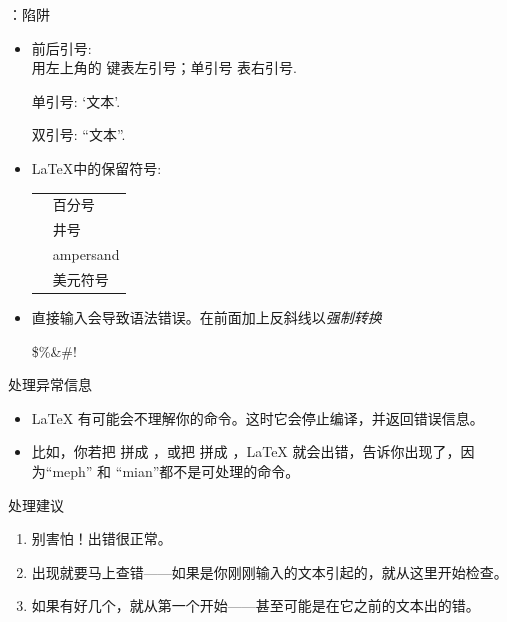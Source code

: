 \documentclass{beamer}
\begin{document}
\begin{frame}[fragile]{\insertsubsection{}：陷阱}
\small
\begin{itemize}
\item 前后引号:\\
用左上角的 \keystroke{\`{}} 键表左引号；单引号\keystroke{\'{}} 表右引号.
\begin{exampletwouptiny}
单引号: `文本'.

双引号: ``文本''.
\end{exampletwouptiny}

\item \LaTeX 中的保留符号:\\[1ex]
\begin{tabular}{cl}
\keystrokebftt{\%} & 百分号              \\
\keystrokebftt{\#} & 井号     \\
\keystrokebftt{\&} & ampersand                 \\
\keystrokebftt{\$} & 美元符号               \\
\end{tabular}
\item 直接输入会导致语法错误。在前面加上反斜线以\emph{强制转换}
\begin{exampletwoup}
\$\%\&\#!
\end{exampletwoup}
\end{itemize}
\end{frame}

\begin{frame}[fragile]{处理异常信息}
\begin{itemize}
\item \LaTeX{} 有可能会不理解你的命令。这时它会停止编译，并返回错误信息。
\item 比如，你若把  拼成 ，或把  拼成 ，\LaTeX{} 就会出错，告诉你出现了，因为``meph'' 和 ``mian''都不是可处理的命令。
\end{itemize}
\begin{block}{处理建议}
\begin{enumerate}
\item 别害怕！出错很正常。
\item 出现就要马上查错——如果是你刚刚输入的文本引起的，就从这里开始检查。
\item 如果有好几个，就从第一个开始——甚至可能是在它之前的文本出的错。
\end{enumerate}
\end{block}
\end{frame}
\end{document}
